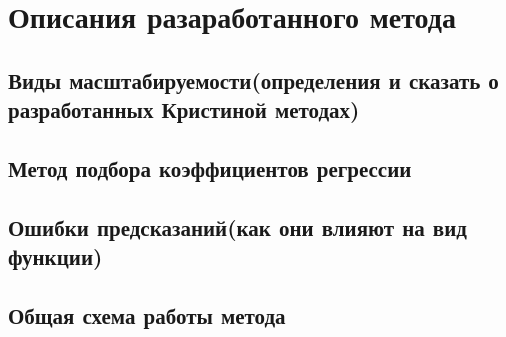 \chapter{Описания разаработанного метода}
	\section{Виды масштабируемости(определения и сказать о разработанных Кристиной методах)}
	\section{Метод подбора коэффициентов регрессии}
	\section{Ошибки предсказаний(как они влияют на вид функции)}

	\section{}

	\section{Общая схема работы метода}
\clearpage